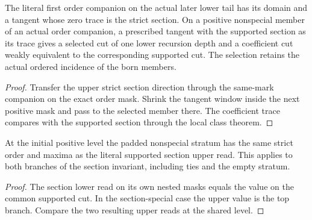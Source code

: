 \begin{theorem}
\label{hir:g1-actual-later-selected-companion-tangent}
\leanok
The literal first order companion on the actual later lower
tail has its domain and a tangent whose zero trace is the
strict section. On a positive nonspecial member of an actual
order companion, a prescribed tangent with the supported
section as its trace gives a selected cut of one lower
recursion depth and a coefficient cut weakly equivalent to
the corresponding supported cut. The selection retains the
actual ordered incidence of the born members.
\end{theorem}
\begin{proof}
Transfer the upper strict section direction through the
same-mark companion on the exact order mask. Shrink the
tangent window inside the next positive mask and pass to
the selected member there. The coefficient trace compares
with the supported section through the local class theorem.
\end{proof}

\begin{theorem}
\label{hir:g1-initial-literal-section-stratum}
\leanok
At the initial positive level the padded nonspecial stratum
has the same strict order and maxima as the literal supported
section upper read. This applies to both branches of the
section invariant, including ties and the empty stratum.
\end{theorem}
\begin{proof}
The section lower read on its own nested masks equals the
value on the common supported cut. In the section-special
case the upper value is the top branch. Compare the two
resulting upper reads at the shared level.
\end{proof}

